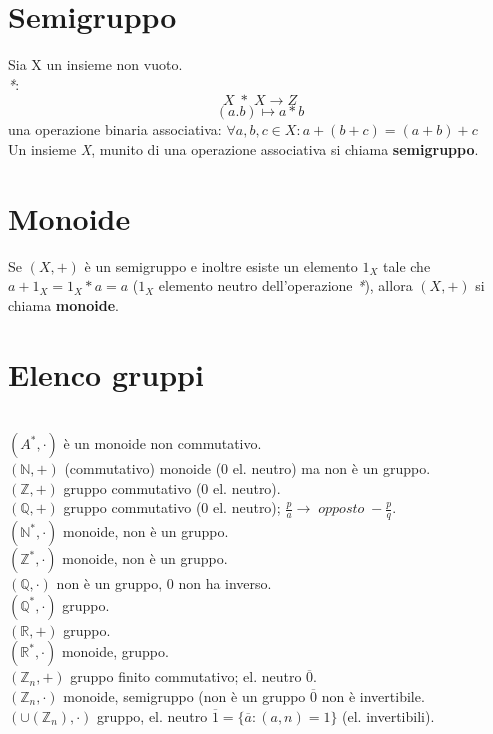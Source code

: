 \section{Semigruppo}
Sia X un insieme non vuoto. 
\\\textit{*}:
\[X\;*\;X\rightarrow Z\]
\[(a.b)\mapsto a * b\]
una operazione binaria associativa: \(\forall a,b,c\in X: a+(b+c)=(a+b)+c\)
\\
Un insieme \textit{X}, munito di una operazione associativa si chiama \textbf{semigruppo}.

\section{Monoide}
Se \((X,+)\) è un semigruppo e inoltre esiste un elemento \(1_X\) tale che \(a+1_X=1_X*a=a\) (\(1_X\) elemento neutro dell'operazione \textit{*}), allora \((X,+)\) si chiama \textbf{monoide}.

\section{Elenco gruppi}
\\\textbf{\((A^*, \cdot )\)} è un monoide non commutativo.
\\\textbf{\((\mathbb{N}, +) \)} (commutativo) monoide (0 el. neutro) ma non è un gruppo.
\\\textbf{\( (\mathbb{Z}, +)\)} gruppo commutativo (0 el. neutro).
\\\textbf{\((\mathbb{Q}, +) \)} gruppo commutativo (0 el. neutro); \(\frac{p}{a}\rightarrow\;opposto\;-\frac{p}{q}\).
\\\textbf{\((\mathbb{N}^*, \cdot)\)} monoide, non è un gruppo.
\\\textbf{\((\mathbb{Z}^*, \cdot)\)} monoide, non è un gruppo.
\\\textbf{\((\mathbb{Q}, \cdot)\)} non è un gruppo, 0 non ha inverso.
\\\textbf{\((\mathbb{Q}^*,\cdot)\)} gruppo.
\\\textbf{\((\mathbb{R}, +)\)} gruppo.
\\\textbf{\((\mathbb{R}^*, \cdot)\)} monoide, gruppo.
\\\textbf{\((\mathbb{Z}_n, +)\)} gruppo finito commutativo; el. neutro \(\overline{0}\).
\\\textbf{\((\mathbb{Z}_n,\cdot)\)} monoide, semigruppo (non è un gruppo \(\overline{0}\) non è invertibile.
\\\textbf{\((\cup (\mathbb{Z}_n),\cdot) \)} gruppo, el. neutro \(\overline{1}=\{\overline{a}: (a,n)=1\}\) (el. invertibili).
